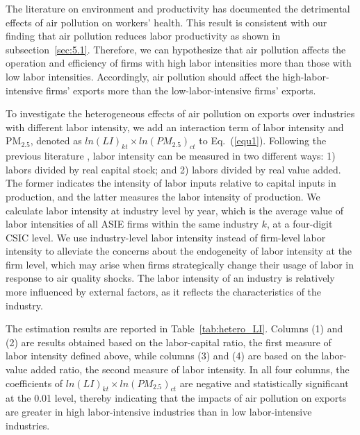 \documentclass[12pt]{article}
\begin{document}
\label{sec:5.2.2} The literature on environment and productivity %
\citep[e.g.,][]{chang2016particulate,adhvaryu2022management} has documented the
detrimental effects of air pollution on workers' health. This result is
consistent with our finding that air pollution reduces labor productivity as
shown in subsection~\ref{sec:5.1}. Therefore, we can hypothesize that air
pollution affects the operation and efficiency of firms with high labor
intensities more than those with low labor intensities. Accordingly, air
pollution should affect the high-labor-intensive firms' exports more than
the low-labor-intensive firms' exports. 


To investigate the heterogeneous effects of air pollution on exports over
industries with different labor intensity, we add an interaction term of
labor intensity and $\mathrm{PM_{2.5}}$, denoted as $ln(LI)_{kt} \times ln(PM_{2.5})_{ct}$ to Eq.~(\ref{equ1}). 
Following the previous literature %
\citep{dewenter2001state}, labor intensity can be measured in two different
ways: 1) labors divided by real capital stock; and 2) labors divided by real
value added. The former indicates the intensity of labor inputs relative to capital 
inputs in production, and the latter measures the labor intensity of production. 
We calculate labor
intensity at industry level by year, which is the average value of labor
intensities of all ASIE firms within the same industry $k$, at a four-digit CSIC level. We use industry-level labor intensity
instead of firm-level labor intensity to alleviate the concerns about the
endogeneity of labor intensity at the firm level, which may arise when firms
strategically change their usage of labor in response to air quality shocks.
The labor intensity of an industry is relatively more influenced by external factors, as it reflects
the characteristics of the industry.

The estimation results are reported in
Table~\ref{tab:hetero_LI}. Columns (1) and (2) are results obtained based on the labor-capital ratio, the first measure of labor intensity defined above, while columns (3) and (4) are based on the labor-value added ratio, the second measure of labor intensity. 
In all four columns, the coefficients of $ln(LI)_{kt} \times ln(PM_{2.5})_{ct}$ are negative and statistically significant at the 0.01 level,
thereby indicating that the impacts of air pollution on exports are greater in high
labor-intensive industries than in low labor-intensive industries.
\end{document}
